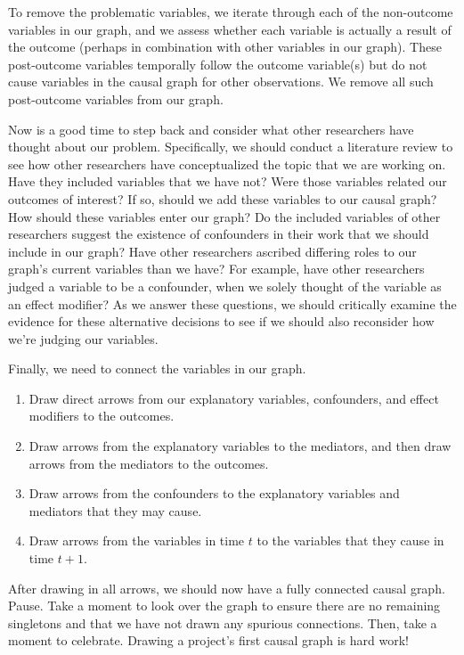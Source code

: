 To remove the problematic variables, we iterate through each of the non-outcome variables in our graph, and we assess whether each variable is actually a result of the outcome (perhaps in combination with other variables in our graph).
These post-outcome variables temporally follow the outcome variable(s) but do not cause variables in the causal graph for other observations.
We remove all such post-outcome variables from our graph.

Now is a good time to step back and consider what other researchers have thought about our problem.
Specifically, we should conduct a literature review to see how other researchers have conceptualized the topic that we are working on.
Have they included variables that we have not?
Were those variables related our outcomes of interest?
If so, should we add these variables to our causal graph? How should these variables enter our graph?
Do the included variables of other researchers suggest the existence of confounders in their work that we should include in our graph?
Have other researchers ascribed differing roles to our graph's current variables than we have?
For example, have other researchers judged a variable to be a confounder, when we solely thought of the variable as an effect modifier?
As we answer these questions, we should critically examine the evidence for these alternative decisions to see if we should also reconsider how we're judging our variables.

Finally, we need to connect the variables in our graph.
\begin{enumerate}
   \item Draw direct arrows from our explanatory variables, confounders, and effect modifiers to the outcomes.
   \item Draw arrows from the explanatory variables to the mediators, and then draw arrows from the mediators to the outcomes.
   \item Draw arrows from the confounders to the explanatory variables and mediators that they may cause.
   \item Draw arrows from the variables in time $t$ to the variables that they cause in time $t+1$.
\end{enumerate}
After drawing in all arrows, we should now have a fully connected causal graph.
Pause.
Take a moment to look over the graph to ensure there are no remaining singletons and that we have not drawn any spurious connections.
Then, take a moment to celebrate.
Drawing a project's first causal graph is hard work!

